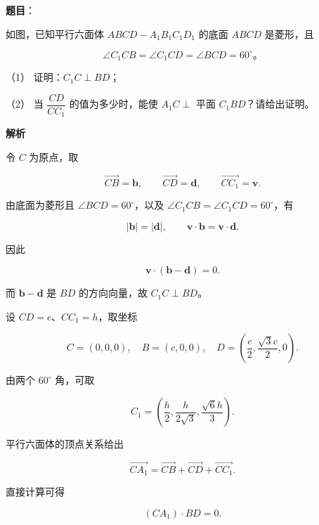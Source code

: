\begin{answer}

\textbf{题目}：

如图，已知平行六面体 $ABCD-A_1B_1C_1D_1$ 的底面 $ABCD$ 是菱形，且

\nopagebreak[4]
\[
\angle C_1CB=\angle C_1CD=\angle BCD=60^\circ\text{。}
\]

（1） 证明：$C_1C\perp BD$；

（2） 当 $\dfrac{CD}{CC_1}$ 的值为多少时，能使 $A_1C\perp$ 平面 $C_1BD$？请给出证明。
\nopagebreak[4]
\begin{center}\end{center}
\nopagebreak[4]
\textbf{解析}


令 $C$ 为原点，取

\nopagebreak[4]
\[
\overrightarrow{CB}=\mathbf b,\qquad
\overrightarrow{CD}=\mathbf d,\qquad
\overrightarrow{CC_1}=\mathbf v.
\]

由底面为菱形且 $\angle BCD=60^\circ$，以及
$\angle C_1CB=\angle C_1CD=60^\circ$，有

\nopagebreak[4]
\[
|\mathbf b|=|\mathbf d|,
\qquad
\mathbf v\cdot\mathbf b=\mathbf v\cdot\mathbf d.
\]

因此

\nopagebreak[4]
\[
\mathbf v\cdot(\mathbf b-\mathbf d)=0.
\]

而 $\mathbf b-\mathbf d$ 是 $BD$ 的方向向量，故 $C_1C\perp BD$。


设 $CD=c$、$CC_1=h$，取坐标

\nopagebreak[4]
\[
C=(0,0,0),\quad B=(c,0,0),\quad
D=\left(\frac c2,\frac{\sqrt3c}{2},0\right).
\]

由两个 $60^\circ$ 角，可取

\nopagebreak[4]
\[
C_1=\left(\frac h2,\frac h{2\sqrt3},\frac{\sqrt6h}{3}\right).
\]

平行六面体的顶点关系给出

\nopagebreak[4]
\[
\overrightarrow{CA_1}=\overrightarrow{CB}+\overrightarrow{CD}+\overrightarrow{CC_1}.
\]

直接计算可得

\nopagebreak[4]
\[
(CA_1)\cdot BD=0.
\]


\end{answer}
